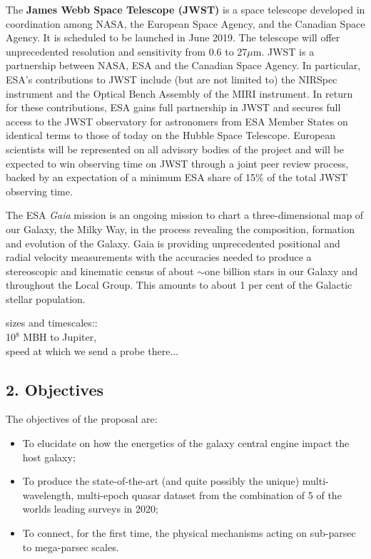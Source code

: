 \begin{framed}
The {\bf James Webb Space Telescope (JWST)} is a space telescope
developed in coordination among NASA, the European Space Agency, and
the Canadian Space Agency. It is scheduled to be launched in June
2019. The telescope will offer unprecedented resolution and
sensitivity from 0.6 to 27$\mu$m.
JWST is a partnership between NASA, ESA and the Canadian Space Agency.
In particular, ESA's contributions to JWST include (but are not
limited to) the NIRSpec instrument and the Optical Bench Assembly of
the MIRI instrument.  In return for these contributions, ESA gains
full partnership in JWST and secures full access to the JWST
observatory for astronomers from ESA Member States on identical terms
to those of today on the Hubble Space Telescope. European scientists
will be represented on all advisory bodies of the project and will be
expected to win observing time on JWST through a joint peer review
process, backed by an expectation of a minimum ESA share of 15\% of
the total JWST observing time.


The ESA {\it Gaia} mission is an ongoing mission to chart a
three-dimensional map of our Galaxy, the Milky Way, in the process
revealing the composition, formation and evolution of the Galaxy. Gaia
is providing unprecedented positional and radial velocity measurements
with the accuracies needed to produce a stereoscopic and kinematic
census of about $\sim$one billion stars in our Galaxy and throughout
the Local Group. This amounts to about 1 per cent of the Galactic
stellar population.
\end{framed}

sizes and timescales:: \\
10$^{8}$ MBH to Jupiter, \\
speed at which we send a probe there...\\



\subsection*{2. Objectives}

\noindent
The objectives of the proposal are:
\begin{itemize}
\item To elucidate on how the energetics of the galaxy central engine impact the host galaxy;
\item To produce the state-of-the-art (and quite possibly the unique) multi-wavelength, multi-epoch 
quasar dataset from the combination of 5 of the worlds leading surveys in 2020; 
\item To connect, for the first time, the physical mechanisms acting on sub-parsec to mega-parsec scales. 
\end{itemize}


